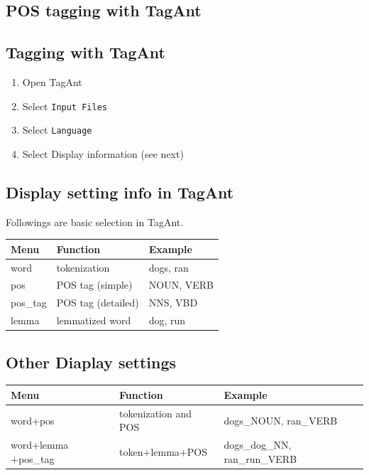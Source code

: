 \documentclass[
  english,
  11pt,
]{article}
\providecommand{\tightlist}{%
  \setlength{\itemsep}{0pt}\setlength{\parskip}{0pt}}
\begin{document}
\subsection{POS tagging with TagAnt}\label{pos-tagging-with-tagant}

\subsection{Tagging with TagAnt}\label{tagging-with-tagant}

\begin{enumerate}
\def\labelenumi{\arabic{enumi}.}
\tightlist
\item
  Open TagAnt
\item
  Select \texttt{Input\ Files}
\item
  Select \texttt{Language}
\item
  Select Display information (see next)
\end{enumerate}

\subsection{Display setting info in
TagAnt}\label{display-setting-info-in-tagant}

Followings are basic selection in TagAnt.

\begin{longtable}[]{@{}lll@{}}
\toprule\noalign{}
Menu & Function & Example \\
\midrule\noalign{}
\endhead
\bottomrule\noalign{}
\endlastfoot
word & tokenization & dogs, ran \\
pos & POS tag (simple) & NOUN, VERB \\
pos\_tag & POS tag (detailed) & NNS, VBD \\
lemma & lemmatized word & dog, run \\
\end{longtable}

\subsection{Other Diaplay settings}\label{other-diaplay-settings}

\begin{longtable}[]{@{}lll@{}}
\toprule\noalign{}
Menu & Function & Example \\
\midrule\noalign{}
\endhead
\bottomrule\noalign{}
\endlastfoot
word+pos & tokenization and POS & dogs\_NOUN, ran\_VERB \\
word+lemma +pos\_tag & token+lemma+POS & dogs\_dog\_NN,
ran\_run\_VERB \\
\end{longtable}
\end{document}
